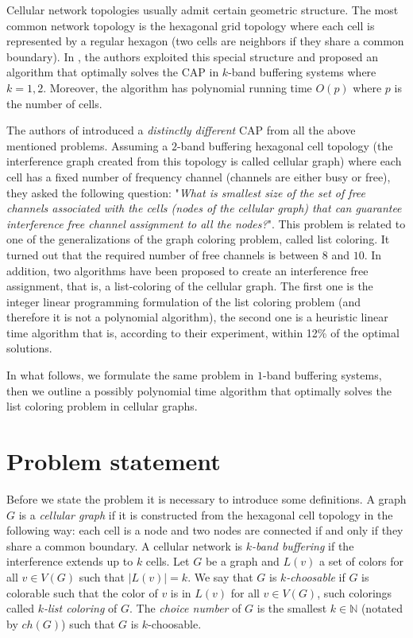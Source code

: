 \documentclass[letterpaper, 10 pt, conference]{ieeeconf}  %
\begin{document}
Cellular network topologies usually admit certain geometric structure. The most common network topology is the hexagonal grid topology where each cell is represented by a regular hexagon (two cells are neighbors if they share a common boundary). In \cite{662943}, the authors exploited this special structure and proposed an algorithm that optimally solves the CAP in $k$-band buffering systems where $k=1,2$. Moreover, the algorithm has polynomial running time $O(p)$ where $p$ is the number of cells.

The authors of \cite{7248845} introduced a \textit{distinctly different} CAP from all the above mentioned problems. Assuming a $2$-band buffering hexagonal cell topology (the interference graph created from this topology is called cellular graph) where each cell has a fixed number of frequency channel (channels are either busy or free), they asked the following question: "\textit{What is smallest size of the set of free channels associated with the cells (nodes of the cellular graph) that can guarantee interference free channel assignment to all the nodes?}". This problem is related to one of the generalizations of the graph coloring problem, called list coloring. It turned out that the required number of free channels is between $8$ and $10$. In addition, two algorithms have been proposed to create an interference free assignment, that is, a list-coloring of the cellular graph. The first one is the integer linear programming formulation of the list coloring problem (and therefore it is not a polynomial algorithm), the second one is a heuristic linear time algorithm that is, according to their experiment, within 12\% of the optimal solutions.

In what follows, we formulate the same problem in $1$-band buffering systems, then we outline a possibly polynomial time algorithm that optimally solves the list coloring problem in cellular graphs.

\section{Problem statement}

Before we state the problem it is necessary to introduce some definitions. A graph $G$ is a  \textit{cellular graph} if it is constructed from the hexagonal cell topology in the following way: each cell is a node and two nodes are connected if and only if they share a common boundary.
A cellular network is $k$\textit{-band buffering} if the interference extends up to $k$ cells.
Let $G$ be a graph and $L(v)$ a set of colors for all $v \in V(G)$ such that $|L(v)|=k$. We say that $G$ is $k$\textit{-choosable} if $G$ is colorable such that the color of $v$ is in $L(v)$ for all $v \in V(G)$, such colorings called $k$\textit{-list coloring} of $G$. The \textit{choice number} of $G$ is the smallest $k \in \mathbb{N}$ (notated by $ch(G)$) such that $G$ is $k$-choosable.
\end{document}
